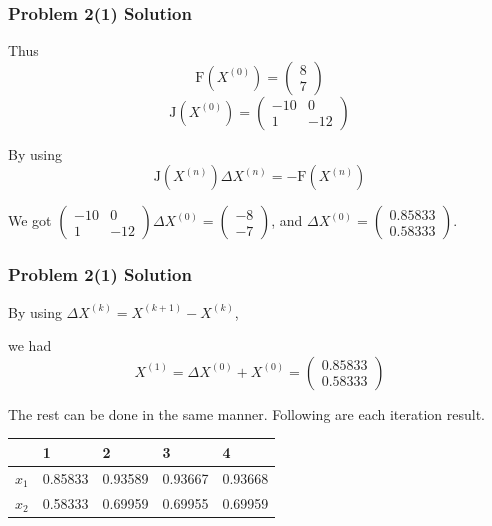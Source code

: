\documentclass{beamer}
\begin{document}
\begin{frame}
\frametitle{Problem 2(1) Solution}
Thus \begin{equation}\mathrm{F}\left(X^{(0)}\right)=\left(\begin{array}{l}
8 \\
7
\end{array}\right)\end{equation}
\begin{equation}\mathrm{J}\left(X^{(0)}\right)=\left(\begin{array}{cc}
-10 & 0 \\
1 & -12
\end{array}\right)\end{equation}

By using \begin{equation}\mathrm{J}\left(X^{(n)}\right) \Delta X^{(n)}=-\mathrm{F}\left(X^{(n)}\right)\end{equation}

We got $\left(\begin{array}{cc}
-10 & 0 \\
1 & -12
\end{array}\right) \Delta X^{(0)}=\left(\begin{array}{l}
-8 \\
-7
\end{array}\right)$, and $\Delta X^{(0)}=\left(\begin{array}{l}
0.85833 \\
0.58333
\end{array}\right)$.

\end{frame}
\begin{frame}
\frametitle{Problem 2(1) Solution}
By using $\Delta X^{(k)}=X^{(k+1)}-X^{(k)}$,

we had 
\begin{equation}
X^{(1)}=\Delta X^{(0)}+X^{(0)}=\left(\begin{array}{c}
0.85833 \\
0.58333
\end{array}\right)
\end{equation}

The rest can be done in the same manner. Following are each iteration result.

\begin{table}[]
\begin{tabular}{lllll}
\hline
      & 1         & 2         & 3         & 4       \\ \hline
$x_1$ & 0.85833  & 0.93589  & 0.93667  & 0.93668  \\
$x_2$ & 0.58333 & 0.69959 & 0.69955 & 0.69959 \\ \hline
\end{tabular}
\end{table}

\end{frame}
\end{document}
